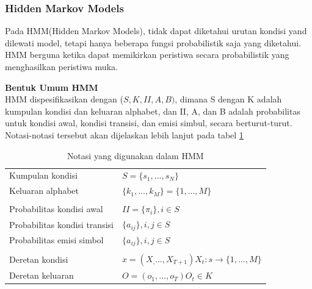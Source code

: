 \subsubsection{Hidden Markov Models}
\label{sec:hidden-markov-models}
\cite{manning1999natural} 
Pada HMM(Hidden Markov Models), tidak dapat diketahui urutan kondisi yand dilewati model, tetapi hanya beberapa fungsi probabilistik saja yang diketahui. HMM berguna ketika dapat memikirkan peristiwa secara probabilistik yang menghasilkan peristiwa muka. 

\textbf{Bentuk Umum HMM}\\
\cite{manning1999natural} 
HMM dispesifikasikan dengan (\(S,K,II,A,B)\), dimana S dengan K adalah kumpulan kondisi dan keluaran alphabet, dan II, A, dan B adalah probabilitas untuk kondisi awal, kondisi transisi, dan emisi simbul, secara berturut-turut. Notasi-notasi tersebut akan dijelaskan lebih lanjut pada tabel \ref{tab:hmm-notation}

\cite{manning1999natural} 
\begin{table}%
	\centering
\begin{tabular}{l l}
Kumpulan kondisi  & \(S=\{ s_1,...,s_N\}\)\\
Keluaran alphabet	& \(\{k_1,...,k_M\} = \{1,...,M\}\)\\
\\
Probabilitas kondisi awal & \(II = \{\pi_i\}, i\in S\)\\
Probabilitas kondisi transisi & \(\{a_{ij}\},i,j\in S\)\\
Probabilitas emisi simbol & \(\{a_{ij}\},i,j\in S\)\\
\\
Deretan kondisi	& \(x= (X_,...,X_{T+1}) X_t : s \stackrel{}{\rightarrow} \{1,...,M\}\)\\
Deretan keluaran & \(O= (o_1,...,o_T) O_t \in K\)
\end{tabular}
\caption{Notasi yang digunakan dalam HMM}
\label{tab:hmm-notation}
\end{table}


